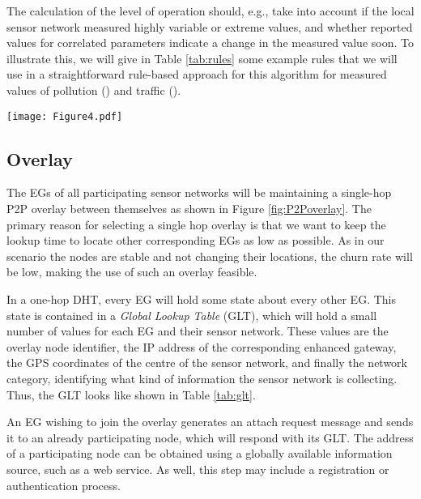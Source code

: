 \documentclass[onecolumn]{jaise2e}
\begin{document}
The calculation of the level of operation should, e.g., take into account if the local sensor network measured highly variable or extreme values, and whether reported values for correlated parameters indicate a change in the measured value soon. To illustrate this, we will give in Table \ref{tab:rules} some example rules that we will use in a straightforward rule-based approach for this algorithm for measured values of pollution () and traffic ().



\begin{figure*}[!t]
\centering
\texttt{[image: Figure4.pdf]} 
\caption{P2P overlay Network}
\label{fig:P2Poverlay}
\end{figure*}


\subsection{Overlay}\label{subsec:overlay}

The EGs  of all participating sensor networks  will be maintaining a single-hop P2P overlay between themselves as shown in Figure \ref{fig:P2Poverlay}. The primary reason for selecting a single hop overlay is that we want to keep the lookup time to locate other corresponding EGs as low as possible. As in our scenario the nodes are stable and not changing their locations, the churn rate will be low, making the use of such an overlay feasible.



In a one-hop DHT, every EG will hold some state about every other EG. This state is contained in a \textit{Global Lookup Table} (GLT), which will hold a small number of values for each EG and their sensor network. These values are the overlay node identifier, the IP address of the corresponding enhanced gateway, the GPS coordinates of the centre of the sensor network, and finally the network category, identifying what kind of information the sensor network is collecting. Thus, the GLT looks like shown in Table \ref{tab:glt}. 

An EG wishing to join the overlay generates an attach request message and sends it to an already participating node, which will respond with its GLT. The address of a participating node can be obtained using a globally available information source, such as a web service. As well, this step may include a registration or authentication process.
\end{document}
